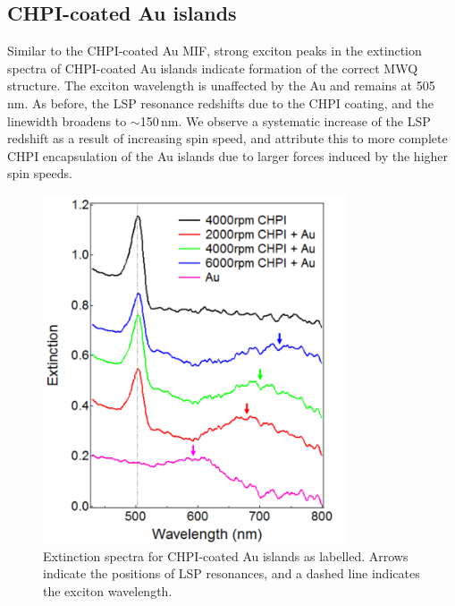 \subsection{CHPI-coated Au islands}
Similar to the CHPI-coated Au MIF, strong exciton peaks in the extinction spectra of CHPI-coated Au islands indicate formation of the correct MWQ structure. The exciton wavelength is unaffected by the Au and remains at 505\,nm. As before, the LSP resonance redshifts due to the CHPI coating, and the linewidth broadens to $\sim$150\,nm. We observe a systematic increase of the LSP redshift as a result of increasing spin speed, and attribute this to more complete CHPI encapsulation of the Au islands due to larger forces induced by the higher spin speeds.
\begin{figure}[ht] 
\centering    
\includegraphics[width=0.8\textwidth]{Fig10}
\caption{Extinction spectra for CHPI-coated Au islands as labelled. Arrows indicate the positions of LSP resonances, and a dashed line indicates the exciton wavelength.}
\label{6Fig10}
\end{figure}


